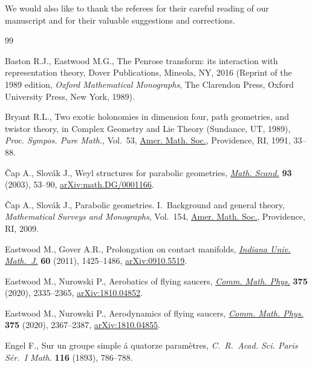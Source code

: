 \documentclass[10pt,a4paper]{amsart}
\numberwithin{equation}{section}
\begin{document}
We would also like to thank the referees for their careful reading of our
manuscript and for their valuable suggestions and corrections.


\begin{thebibliography}{99}
\footnotesize\itemsep=0pt

Baston R.J., Eastwood M.G., The {P}enrose transform: its interaction with
 representation theory, Dover Publications, Mineola, NY, 2016
 (Reprint of the 1989 edition, \textit{Oxford Mathematical Monographs}, The Clarendon Press,
 Oxford University Press, New York, 1989).

Bryant R.L., Two exotic holonomies in dimension four, path geometries, and
 twistor theory, in Complex Geometry and {L}ie Theory ({S}undance, {UT},
 1989), \textit{Proc. Sympos. Pure Math.}, Vol.~53, \href{https://doi.org/10.1090/pspum/053/1141197}{Amer. Math. Soc.},
 Providence, RI, 1991, 33--88.

\v{C}ap A., Slov\'ak J., Weyl structures for parabolic geometries,
 \href{https://doi.org/10.7146/math.scand.a-14413}{\textit{Math. Scand.}} \textbf{93} (2003), 53--90, \href{https://arxiv.org/abs/math.DG/0001166}{arXiv:math.DG/0001166}.

\v{C}ap A., Slov\'ak J., Parabolic geometries. {I}.~Background and general
 theory, \textit{Mathematical Surveys and Monographs}, Vol.~154, \href{https://doi.org/10.1090/surv/154}{Amer. Math.
 Soc.}, Providence, RI, 2009.

Eastwood M., Gover A.R., Prolongation on contact manifolds, \href{https://doi.org/10.1512/iumj.2011.60.4980}{\textit{Indiana
 Univ. Math.~J.}} \textbf{60} (2011), 1425--1486, \href{https://arxiv.org/abs/0910.5519}{arXiv:0910.5519}.

Eastwood M., Nurowski P., Aerobatics of flying saucers, \href{https://doi.org/10.1007/s00220-019-03621-2}{\textit{Comm. Math.
 Phys.}} \textbf{375} (2020), 2335--2365, \href{https://arxiv.org/abs/1810.04852}{arXiv:1810.04852}.

Eastwood M., Nurowski P., Aerodynamics of flying saucers, \href{https://doi.org/10.1007/s00220-019-03622-1}{\textit{Comm. Math.
 Phys.}} \textbf{375} (2020), 2367--2387, \href{https://arxiv.org/abs/1810.04855}{arXiv:1810.04855}.

Engel F., Sur un groupe simple \'a quatorze param\`etres, \textit{C.~R.~Acad.
 Sci. Paris S\'er.~I Math.} \textbf{116} (1893), 786--788.


\end{thebibliography}
\end{document}
